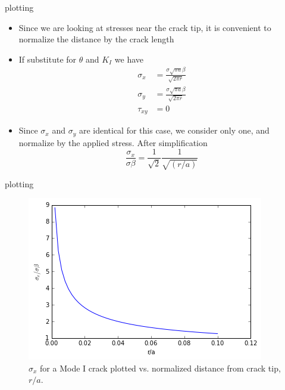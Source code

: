 \documentclass[10pt]{beamer}
\begin{document}
\begin{frame}{plotting}
	\begin{itemize}
		\item Since we are looking at stresses near the crack tip, it is convenient to normalize the distance by the crack length
		\item If substitute for $\theta$ and $K_I$ we have
		\begin{align*}
		\sigma_x &= \frac{\sigma\sqrt{\pi a} \beta}{\sqrt{2\pi r}} \\
		\sigma_y &= \frac{\sigma\sqrt{\pi a} \beta}{\sqrt{2\pi r}} \\
		\tau_{xy} &= 0
		\end{align*}
		\item Since $\sigma_x$ and $\sigma_y$ are identical for this case, we consider only one, and normalize by the applied stress. After simplification
		\begin{equation*}
		\frac{\sigma_x}{\sigma\beta} = \frac{1}{\sqrt{2}} \frac{1}{\sqrt{(r/a)}}
		\end{equation*}
	\end{itemize}
\end{frame}

\begin{frame}{plotting}
	\begin{figure}
	\centering
	\includegraphics[width=0.7\linewidth]{sigmax_vs_ra}
	\caption{$\sigma_x$ for a Mode I crack plotted vs. normalized distance from crack tip, $r/a$.}
	\label{fig:sigmax_vs_ra}
	\end{figure}
\end{frame}
\end{document}
